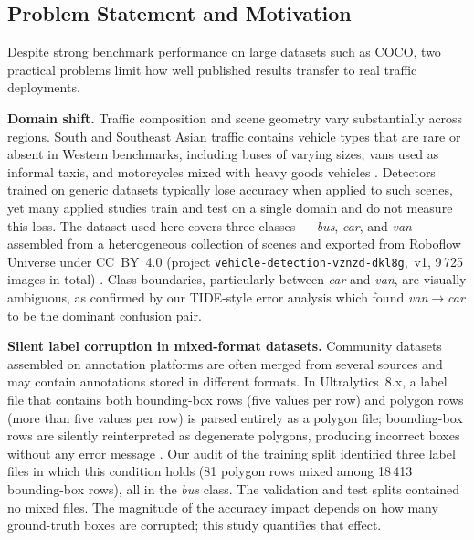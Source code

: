 \subsection{Problem Statement and Motivation}

Despite strong benchmark performance on large datasets such as COCO, two practical
problems limit how well published results transfer to real traffic deployments.

\textbf{Domain shift.}
Traffic composition and scene geometry vary substantially across regions.
South and Southeast Asian traffic contains vehicle types that are rare or absent in
Western benchmarks, including buses of varying sizes, vans used as informal taxis, and
motorcycles mixed with heavy goods vehicles \cite{amin2021traffic}.
Detectors trained on generic datasets typically lose accuracy when applied to such
scenes, yet many applied studies train and test on a single domain and do not measure
this loss.
The dataset used here covers three classes — \textit{bus}, \textit{car}, and
\textit{van} — assembled from a heterogeneous collection of scenes and exported from
Roboflow Universe under CC~BY~4.0 (project
\texttt{vehicle-detection-vznzd-dkl8g},~v1, 9\,725 images in total)
\cite{roboflow_dataset}.
Class boundaries, particularly between \textit{car} and \textit{van}, are
visually ambiguous, as confirmed by our TIDE-style error analysis which found
\textit{van}$\rightarrow$\textit{car} to be the dominant confusion pair.

\textbf{Silent label corruption in mixed-format datasets.}
Community datasets assembled on annotation platforms are often merged from several
sources and may contain annotations stored in different formats.
In Ultralytics~8.x, a label file that contains both bounding-box rows (five values per
row) and polygon rows (more than five values per row) is parsed entirely as a polygon
file; bounding-box rows are silently reinterpreted as degenerate polygons, producing
incorrect boxes without any error message \cite{ultralytics_repo}.
Our audit of the training split identified three label files in which this condition
holds (81 polygon rows mixed among 18\,413 bounding-box rows), all in the
\textit{bus} class.
The validation and test splits contained no mixed files.
The magnitude of the accuracy impact depends on how many ground-truth boxes are
corrupted; this study quantifies that effect.

